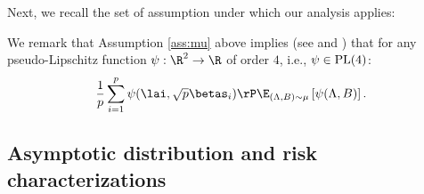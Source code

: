 \vspace{5pt}
Next, we recall the set of assumption under which our analysis applies:


\asstwo*
\assthree*


%
%



\noindent We remark that Assumption \ref{ass:mu} above implies (see \cite[Lem.~4]{bayati2011dynamics} and \cite[Lem.~A3]{javanmard2013state}) that for any pseudo-Lipschitz function $\psi:\R^2\rightarrow\R$ of order $4$, i.e., $\psi\in\rm{PL}(4)$:
$$
\frac{1}{p}\sum_{i=1}^p\psi(\lai,\sqrt{p}\betas_i) \rP \E_{(\Lambda,B)\sim\mu}\left[ \psi(\Lambda,B)\right].
$$




\subsection{Asymptotic distribution and risk characterizations}

